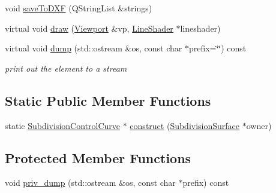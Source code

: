 \begin{DoxyCompactItemize}
\item 
void \hyperlink{classShipCAD_1_1SubdivisionControlCurve_a7313375d402d6ad959f1f9c2609d693b}{save\-To\-D\-X\-F} (Q\-String\-List \&strings)
\item 
virtual void \hyperlink{classShipCAD_1_1SubdivisionControlCurve_a4d7d8e87dc582529e763039ffe593360}{draw} (\hyperlink{classShipCAD_1_1Viewport}{Viewport} \&vp, \hyperlink{classShipCAD_1_1LineShader}{Line\-Shader} $\ast$lineshader)
\item 
virtual void \hyperlink{classShipCAD_1_1SubdivisionControlCurve_a30e8d074583a386be2ab6343cb5f8502}{dump} (std\-::ostream \&os, const char $\ast$prefix=\char`\"{}\char`\"{}) const 
\begin{DoxyCompactList}\small\item\em print out the element to a stream \end{DoxyCompactList}\end{DoxyCompactItemize}
\subsection*{Static Public Member Functions}
\begin{DoxyCompactItemize}
\item 
static \hyperlink{classShipCAD_1_1SubdivisionControlCurve}{Subdivision\-Control\-Curve} $\ast$ \hyperlink{classShipCAD_1_1SubdivisionControlCurve_a21d9226cc2fd7efcaf6f1067912a0b34}{construct} (\hyperlink{classShipCAD_1_1SubdivisionSurface}{Subdivision\-Surface} $\ast$owner)
\end{DoxyCompactItemize}
\subsection*{Protected Member Functions}
\begin{DoxyCompactItemize}
\item 
void \hyperlink{classShipCAD_1_1SubdivisionControlCurve_a48fbb761e8c85120ba7f6876d873e898}{priv\-\_\-dump} (std\-::ostream \&os, const char $\ast$prefix) const 
\end{DoxyCompactItemize}
